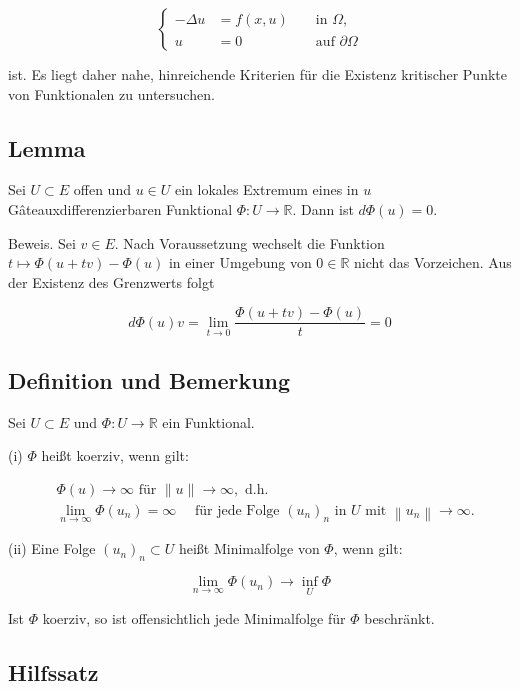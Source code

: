 \documentclass[10pt, letterpaper]{article}
\begin{document}
$$
\left\{\begin{aligned}
-\Delta u & =f(x, u) & & \text { in } \Omega, \\
u & =0 & & \text { auf } \partial \Omega
\end{aligned}\right.
$$

ist. Es liegt daher nahe, hinreichende Kriterien für die Existenz kritischer Punkte von Funktionalen zu untersuchen.

\subsection*{Lemma}

Sei $U \subset E$ offen und $u \in U$ ein lokales Extremum eines in $u$ Gâteauxdifferenzierbaren Funktional $\Phi: U \rightarrow \mathbb{R}$. Dann ist $d \Phi(u)=0$.

Beweis. Sei $v \in E$. Nach Voraussetzung wechselt die Funktion $t \mapsto \Phi(u+t v)-\Phi(u)$ in einer Umgebung von $0 \in \mathbb{R}$ nicht das Vorzeichen. Aus der Existenz des Grenzwerts folgt

$$
d \Phi(u) v=\lim _{t \rightarrow 0} \frac{\Phi(u+t v)-\Phi(u)}{t}=0
$$

\subsection*{Definition und Bemerkung}

Sei $U \subset E$ und $\Phi: U \rightarrow \mathbb{R}$ ein Funktional.

(i) $\Phi$ heißt koerziv, wenn gilt:

$$
\begin{aligned}
& \Phi(u) \rightarrow \infty \text { für }\|u\| \rightarrow \infty, \text { d.h. } \\
& \lim _{n \rightarrow \infty} \Phi\left(u_{n}\right)=\infty \quad \text { für jede Folge }\left(u_{n}\right)_{n} \text { in } U \text { mit }\left\|u_{n}\right\| \rightarrow \infty .
\end{aligned}
$$

(ii) Eine Folge $\left(u_{n}\right)_{n} \subset U$ heißt Minimalfolge von $\Phi$, wenn gilt:

$$
\lim _{n \rightarrow \infty} \Phi\left(u_{n}\right) \rightarrow \inf _{U} \Phi
$$

Ist $\Phi$ koerziv, so ist offensichtlich jede Minimalfolge für $\Phi$ beschränkt.

\subsection*{Hilfssatz}
\end{document}
